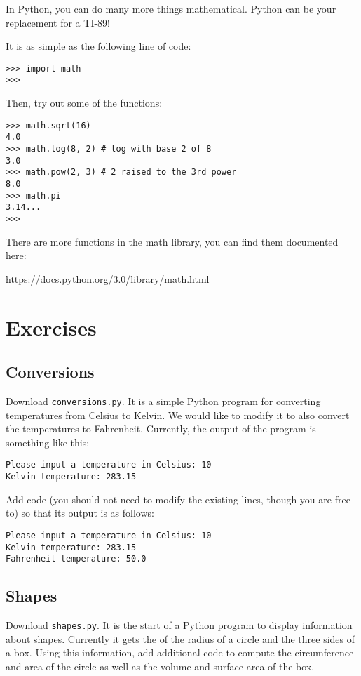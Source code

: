 \documentclass[11pt]{cselabheader}
\begin{document}
In Python, you can do many more things mathematical. Python can be your
replacement for a TI-89!

It is as simple as the following line of code:
\begin{lstlisting}[style=bash]
>>> import math
>>>
\end{lstlisting}

Then, try out some of the functions:
\begin{lstlisting}[style=bash]
>>> math.sqrt(16)
4.0
>>> math.log(8, 2) # log with base 2 of 8
3.0
>>> math.pow(2, 3) # 2 raised to the 3rd power
8.0
>>> math.pi
3.14...
>>>
\end{lstlisting}

There are more functions in the math library, you can find them documented here:
\begin{center}
\url{https://docs.python.org/3.0/library/math.html}
\end{center}

\pagebreak

\section{Exercises}
\subsection{Conversions}
Download \texttt{conversions.py}. It is a simple Python program for converting
temperatures from Celsius to Kelvin. We would like to modify it to also convert
the temperatures to Fahrenheit. Currently, the output of the program is
something like this:

\begin{lstlisting}[style=bash]
Please input a temperature in Celsius: 10
Kelvin temperature: 283.15
\end{lstlisting}

Add code (you should not need to modify the existing lines, though you are free
to) so that its output is as follows:

\begin{lstlisting}[style=bash]
Please input a temperature in Celsius: 10
Kelvin temperature: 283.15
Fahrenheit temperature: 50.0
\end{lstlisting}

\subsection{Shapes}
Download \texttt{shapes.py}. It is the start of a Python program to display
information about shapes. Currently it gets the of the radius of a circle and
the three sides of a box. Using this information, add additional code to compute
the circumference and area of the circle as well as the volume and surface area
of the box.
\end{document}
